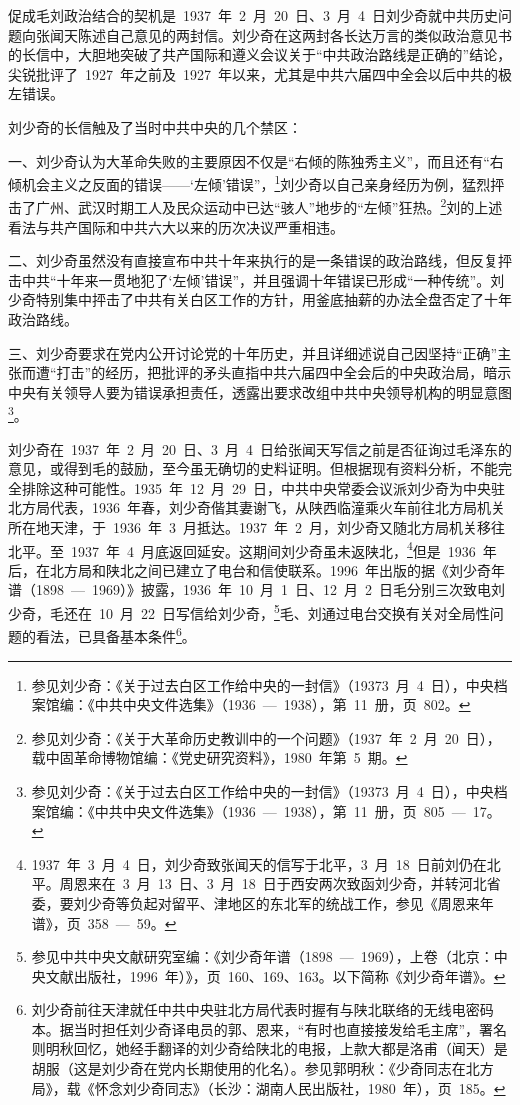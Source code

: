 促成毛刘政治结合的契机是~1937~年~2~月~20~日、3~月~4~日刘少奇就中共历史问题向张闻天陈述自己意见的两封信。刘少奇在这两封各长达万言的类似政治意见书的长信中，大胆地突破了共产国际和遵义会议关于“中共政治路线是正确的”结论，尖锐批评了~1927~年之前及~1927~年以来，尤其是中共六届四中全会以后中共的极左错误。

刘少奇的长信触及了当时中共中央的几个禁区：

一、刘少奇认为大革命失败的主要原因不仅是“右倾的陈独秀主义”，而且还有“右倾机会主义之反面的错误——‘左倾’错误”，\footnote{参见刘少奇：《关于过去白区工作给中央的一封信》（19373~月~4~日），中央档案馆编：《中共中央文件选集》（1936~—~1938），第~11~册，页~802。}刘少奇以自己亲身经历为例，猛烈抨击了广州、武汉时期工人及民众运动中已达“骇人”地步的“左倾”狂热。\footnote{参见刘少奇：《关于大革命历史教训中的一个问题》（1937~年~2~月~20~日），载中固革命博物馆编：《党史研究资料》，1980~年第~5~期。}刘的上述看法与共产国际和中共六大以来的历次决议严重相违。

二、刘少奇虽然没有直接宣布中共十年来执行的是一条错误的政治路线，但反复抨击中共“十年来一贯地犯了‘左倾’错误”，并且强调十年错误已形成“一种传统”。刘少奇特别集中抨击了中共有关白区工作的方针，用釜底抽薪的办法全盘否定了十年政治路线。

三、刘少奇要求在党内公开讨论党的十年历史，并且详细述说自己因坚持“正确”主张而遭“打击”的经历，把批评的矛头直指中共六届四中全会后的中央政治局，暗示中央有关领导人要为错误承担责任，透露出要求改组中共中央领导机构的明显意图\footnote{参见刘少奇：《关于过去白区工作给中央的一封信》（19373~月~4~日），中央档案馆编：《中共中央文件选集》（1936~—~1938），第~11~册，页~805~—~17。}。

刘少奇在~1937~年~2~月~20~日、3~月~4~日给张闻天写信之前是否征询过毛泽东的意见，或得到毛的鼓励，至今虽无确切的史料证明。但根据现有资料分析，不能完全排除这种可能性。1935~年~12~月~29~日，中共中央常委会议派刘少奇为中央驻北方局代表，1936~年春，刘少奇偕其妻谢飞，从陕西临潼乘火车前往北方局机关所在地天津，于~1936~年~3~月抵达。1937~年~2~月，刘少奇又随北方局机关移往北平。至~1937~年~4~月底返回延安。这期间刘少奇虽未返陕北，\footnote{1937~年~3~月~4~日，刘少奇致张闻天的信写于北平，3~月~18~日前刘仍在北平。周恩来在~3~月~13~日、3~月~18~日于西安两次致函刘少奇，并转河北省委，要刘少奇等负起对留平、津地区的东北军的统战工作，参见《周恩来年谱》，页~358~—~59。}但是~1936~年后，在北方局和陕北之间已建立了电台和信使联系。1996~年出版的据《刘少奇年谱（1898~—~1969）》披露，1936~年~10~月~1~日、12~月~2~日毛分别三次致电刘少奇，毛还在~10~月~22~日写信给刘少奇，\footnote{参见中共中央文献研究室编：《刘少奇年谱（1898~—~1969），上卷（北京：中央文献出版社，1996~年）》，页~160、169、163。以下简称《刘少奇年谱》。}毛、刘通过电台交换有关对全局性问题的看法，已具备基本条件\footnote{刘少奇前往天津就任中共中央驻北方局代表时握有与陕北联络的无线电密码本。据当时担任刘少奇译电员的郭、恩来，“有时也直接接发给毛主席”，署名则明秋回忆，她经手翻译的刘少奇给陕北的电报，上款大都是洛甫（闻天）是胡服（这是刘少奇在党内长期使用的化名）。参见郭明秋：《少奇同志在北方局》，载《怀念刘少奇同志》（长沙：湖南人民出版社，1980~年），页~185。}。

